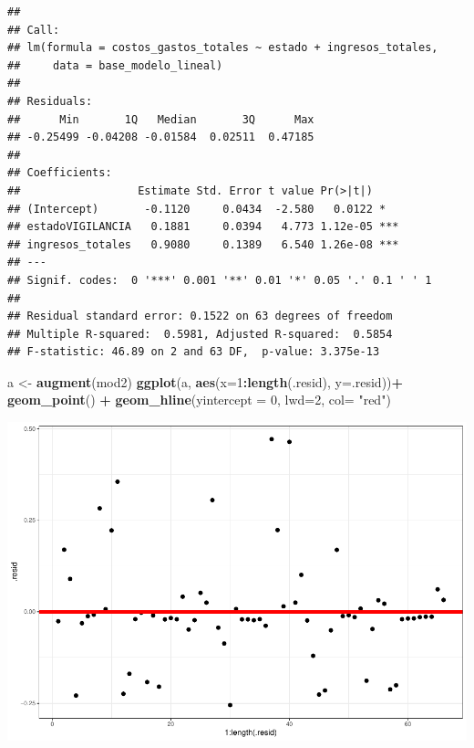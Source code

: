 \documentclass[
  11pt,
  a4paper,
]{book}
\newenvironment{Shaded}{\begin{snugshade}}{\end{snugshade}}
\newcommand{\DataTypeTok}[1]{\textcolor[rgb]{0.13,0.29,0.53}{#1}}
\newcommand{\DecValTok}[1]{\textcolor[rgb]{0.00,0.00,0.81}{#1}}
\newcommand{\KeywordTok}[1]{\textcolor[rgb]{0.13,0.29,0.53}{\textbf{#1}}}
\newcommand{\NormalTok}[1]{#1}
\newcommand{\OperatorTok}[1]{\textcolor[rgb]{0.81,0.36,0.00}{\textbf{#1}}}
\newcommand{\StringTok}[1]{\textcolor[rgb]{0.31,0.60,0.02}{#1}}
\begin{document}
\begin{verbatim}
## 
## Call:
## lm(formula = costos_gastos_totales ~ estado + ingresos_totales, 
##     data = base_modelo_lineal)
## 
## Residuals:
##      Min       1Q   Median       3Q      Max 
## -0.25499 -0.04208 -0.01584  0.02511  0.47185 
## 
## Coefficients:
##                  Estimate Std. Error t value Pr(>|t|)    
## (Intercept)       -0.1120     0.0434  -2.580   0.0122 *  
## estadoVIGILANCIA   0.1881     0.0394   4.773 1.12e-05 ***
## ingresos_totales   0.9080     0.1389   6.540 1.26e-08 ***
## ---
## Signif. codes:  0 '***' 0.001 '**' 0.01 '*' 0.05 '.' 0.1 ' ' 1
## 
## Residual standard error: 0.1522 on 63 degrees of freedom
## Multiple R-squared:  0.5981, Adjusted R-squared:  0.5854 
## F-statistic: 46.89 on 2 and 63 DF,  p-value: 3.375e-13
\end{verbatim}

\begin{Shaded}
\begin{Highlighting}[]
\NormalTok{a <-}\StringTok{ }\KeywordTok{augment}\NormalTok{(mod2)}
\KeywordTok{ggplot}\NormalTok{(a, }\KeywordTok{aes}\NormalTok{(}\DataTypeTok{x=}\DecValTok{1}\OperatorTok{:}\KeywordTok{length}\NormalTok{(.resid), }\DataTypeTok{y=}\NormalTok{.resid))}\OperatorTok{+}
\StringTok{  }\KeywordTok{geom_point}\NormalTok{() }\OperatorTok{+}\StringTok{ }
\StringTok{  }\KeywordTok{geom_hline}\NormalTok{(}\DataTypeTok{yintercept =} \DecValTok{0}\NormalTok{, }\DataTypeTok{lwd=}\DecValTok{2}\NormalTok{, }\DataTypeTok{col=} \StringTok{"red"}\NormalTok{)}
\end{Highlighting}
\end{Shaded}

\includegraphics{index_files/figure-latex/unnamed-chunk-19-1.pdf}
\end{document}
